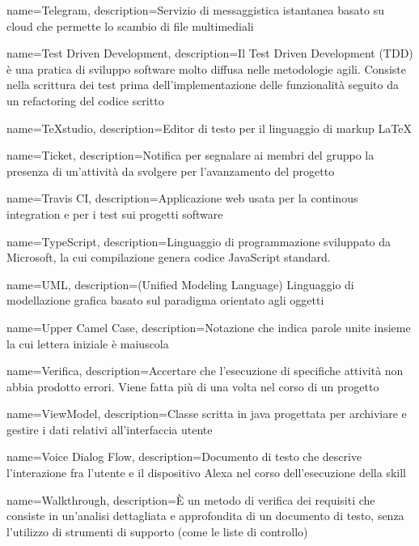 {
	name={Telegram},
	description={Servizio di messaggistica istantanea basato su cloud che permette lo scambio di file multimediali}
}

{
	name={Test Driven Development},
	description={Il Test Driven Development (TDD) è una pratica di sviluppo software molto diffusa nelle metodologie agili.
		Consiste nella scrittura dei test prima dell'implementazione delle funzionalità seguito da un refactoring del codice scritto}
}

{
	name={TeXstudio},
	description={Editor di testo per il linguaggio di markup \LaTeX}
}

{
	name={Ticket},
	description={Notifica per segnalare ai membri del gruppo la presenza di un’attività da svolgere per l’avanzamento del progetto}
}

{
	name={Travis CI},
	description={Applicazione web usata per la continous integration e per i test sui progetti software}
}

{
	name={TypeScript},
	description={Linguaggio di programmazione sviluppato da Microsoft, la cui compilazione genera codice JavaScript standard.}
	{\newpage}
}

{
	name={UML},
	description={(Unified Modeling Language) Linguaggio di modellazione grafica basato sul paradigma orientato agli oggetti}
}

{
	name={Upper Camel Case},
	description={Notazione che indica parole unite insieme la cui lettera iniziale è maiuscola}
	{\newpage}
}

{
	name={Verifica},
	description={Accertare che l’esecuzione di specifiche attività non abbia prodotto errori. Viene fatta più di una volta nel corso di un progetto}
}

{
	name={ViewModel},
	description={Classe scritta in java progettata per archiviare e gestire i dati relativi all'interfaccia utente}
}

{
	name={Voice Dialog Flow},
	description={Documento di testo che descrive l'interazione fra l'utente e il dispositivo Alexa nel corso dell'esecuzione della skill}
	{\newpage}
}

{
	name={Walkthrough},
	description={È un metodo di verifica dei requisiti che consiste in un'analisi dettagliata e approfondita di un documento di testo, senza l'utilizzo di strumenti di supporto (come le liste di controllo)}
}

